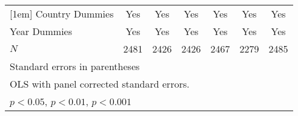 \begin{table}[htbp]
\begin{tabular}{l*{6}{c}}
[1em]
Country Dummies &         Yes         &         Yes         &         Yes         &         Yes         &         Yes         &         Yes         \\
[1em]
Year Dummies &         Yes         &         Yes         &         Yes         &         Yes         &         Yes         &         Yes         \\
\hline
\(N\)       &        2481         &        2426         &        2426         &        2467         &        2279         &        2485         \\
\hline\hline
\multicolumn{7}{l}{\footnotesize Standard errors in parentheses}\\
\multicolumn{7}{l}{\footnotesize OLS with panel corrected standard errors.}\\
\multicolumn{7}{l}{\footnotesize \sym{*} \(p<0.05\), \sym{**} \(p<0.01\), \sym{***} \(p<0.001\)}\\
\end{tabular}
\end{table}
